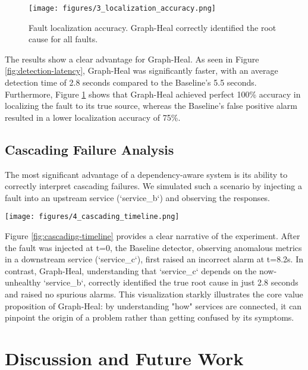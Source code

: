 \documentclass[11pt,conference]{IEEEtran}
\begin{document}
\begin{figure}[ht]
  \centering
  \texttt{[image: figures/3\_localization\_accuracy.png]}
  \caption{Fault localization accuracy. Graph-Heal correctly identified the root cause for all faults.}
  \label{fig:localization-accuracy}
\end{figure}

The results show a clear advantage for Graph-Heal. As seen in Figure \ref{fig:detection-latency}, Graph-Heal was significantly faster, with an average detection time of 2.8 seconds compared to the Baseline's 5.5 seconds. Furthermore, Figure \ref{fig:localization-accuracy} shows that Graph-Heal achieved perfect 100\% accuracy in localizing the fault to its true source, whereas the Baseline's false positive alarm resulted in a lower localization accuracy of 75\%.

\subsection{Cascading Failure Analysis}
The most significant advantage of a dependency-aware system is its ability to correctly interpret cascading failures. We simulated such a scenario by injecting a fault into an upstream service (`service\_b`) and observing the responses.

\begin{figure*}[ht]
  \centering
  \texttt{[image: figures/4\_cascading\_timeline.png]}
  \caption{Timeline of events during the cascading failure scenario. The Baseline detector incorrectly flags a downstream service before the root cause, while Graph-Heal immediately and correctly identifies the source of the fault.}
  \label{fig:cascading-timeline}
\end{figure*}

Figure \ref{fig:cascading-timeline} provides a clear narrative of the experiment. After the fault was injected at t=0, the Baseline detector, observing anomalous metrics in a downstream service (`service\_c`), first raised an incorrect alarm at t=8.2s. In contrast, Graph-Heal, understanding that `service\_c` depends on the now-unhealthy `service\_b`, correctly identified the true root cause in just 2.8 seconds and raised no spurious alarms. This visualization starkly illustrates the core value proposition of Graph-Heal: by understanding "how" services are connected, it can pinpoint the origin of a problem rather than getting confused by its symptoms.

\section{Discussion and Future Work}
\label{sec:discussion}
\end{document}
